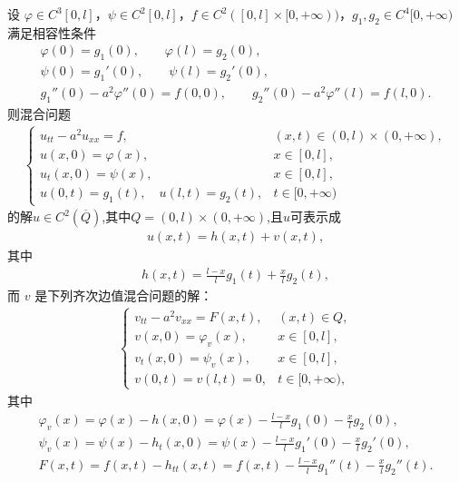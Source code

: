 \documentclass[../../main.tex]{subfiles}%
\begin{document}
\begin{theorem}
\label{theorem:mixed-nonhom-bc}
设 $\varphi\in C^3[0,l]$，$\psi\in C^2[0,l]$，$f\in C^2([0,l]\times[0,+\infty))$，$g_1,g_2\in C^4[0,+\infty)$ 满足相容性条件
\begin{gather}
\varphi(0)=g_1(0),\qquad \varphi(l)=g_2(0), \label{eq:comp-bc1} \\
\psi(0)=g_1'(0),\qquad \psi(l)=g_2'(0), \label{eq:comp-bc2} \\
g_1''(0)-a^2\varphi''(0)=f(0,0),\qquad g_2''(0)-a^2\varphi''(l)=f(l,0). \label{eq:comp-bc3}
\end{gather}
则混合问题
\begin{align}
\begin{cases}
u_{tt}-a^2u_{xx}=f, & (x,t)\in(0,l)\times(0,+\infty), \\
u(x,0)=\varphi(x), & x\in[0,l], \\
u_t(x,0)=\psi(x), & x\in[0,l], \\
u(0,t)=g_1(t),\quad u(l,t)=g_2(t), & t\in[0,+\infty)
\end{cases} \label{eq:mixed-nonhom-bc}
\end{align}
的解$u\in C^2(\overline{Q})$,其中$Q=(0,l)\times(0,+\infty)$,且$u$可表示成
\begin{align}
u(x,t)=h(x,t)+v(x,t), \label{eq:mixed-sol-bc}
\end{align}
其中
\begin{align}
h(x,t)=\frac{l-x}{l}g_1(t)+\frac{x}{l}g_2(t), \label{eq:h-def}
\end{align}
而 $v$ 是下列齐次边值混合问题的解：
\begin{align}
\begin{cases}
v_{tt}-a^2v_{xx}=F(x,t), & (x,t)\in Q, \\
v(x,0)=\varphi_v(x), & x\in[0,l], \\
v_t(x,0)=\psi_v(x), & x\in[0,l], \\
v(0,t)=v(l,t)=0, & t\in[0,+\infty),
\end{cases} \label{eq:v-problem}
\end{align}
其中
\begin{gather*}
\varphi_v(x)=\varphi(x)-h(x,0)=\varphi(x)-\frac{l-x}{l}g_1(0)-\frac{x}{l}g_2(0),  \\
\psi_v(x)=\psi(x)-h_t(x,0)=\psi(x)-\frac{l-x}{l}g_1'(0)-\frac{x}{l}g_2'(0),  \\
F(x,t)=f(x,t)-h_{tt}(x,t)=f(x,t)-\frac{l-x}{l}g_1''(t)-\frac{x}{l}g_2''(t).
\end{gather*}

\end{theorem}
\end{document}
